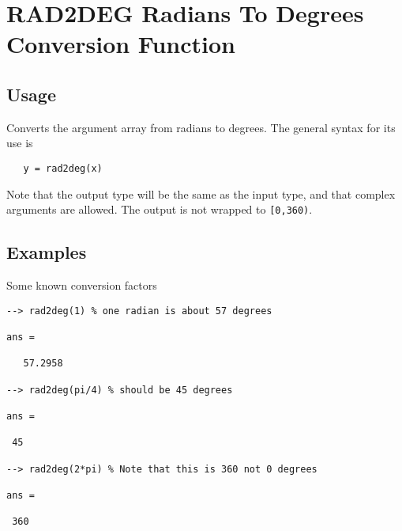 \section{RAD2DEG Radians To Degrees Conversion Function}

\subsection{Usage}

Converts the argument array from radians to degrees.  The general
syntax for its use is
\begin{verbatim}
   y = rad2deg(x)
\end{verbatim}
Note that the output type will be the same as the input type, and that
complex arguments are allowed.  The output is not wrapped to \verb|[0,360)|.
\subsection{Examples}

Some known conversion factors
\begin{verbatim}
--> rad2deg(1) % one radian is about 57 degrees

ans = 

   57.2958 

--> rad2deg(pi/4) % should be 45 degrees

ans = 

 45 

--> rad2deg(2*pi) % Note that this is 360 not 0 degrees

ans = 

 360 
\end{verbatim}
